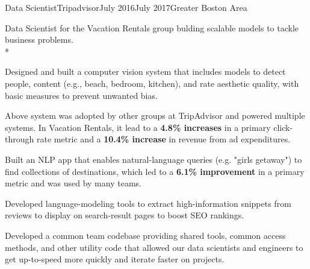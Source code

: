 \documentclass[print]{friggeri-cv} %
\begin{document}
\begin{job}
  {\tripicon}{Data Scientist}{Tripadvisor}{July 2016}{July 2017}{Greater Boston Area}{
    Data Scientist for the Vacation Rentals group bulding scalable models to tackle business problems.\\*
    \begin{myitemize}
      \item Designed and built a computer vision system that includes models to
      detect people, content (e.g., beach, bedroom, kitchen), and rate aesthetic
      quality, with basic measures to prevent unwanted bias.

      \item Above system was adopted by other groups at TripAdvisor and powered multiple
      systems. In Vacation Rentals, it lead to a \textbf{4.8\% increases} in a primary
      click-through rate metric and a \textbf{10.4\% increase} in revenue from ad expenditures.

      \item Built an NLP app that enables natural-language queries (e.g. "girls getaway")
      to find collections of destinations, which led to a \textbf{6.1\% improvement} in a
      primary metric and was used by many teams. 

      \item Developed language-modeling tools to extract high-information snippets from reviews
      to display on search-result pages to boost SEO rankings.

      \item Developed a common team codebase providing shared tools, common
      access methods, and other utility code that allowed our data scientists
      and engineers to get up-to-speed more quickly and iterate faster on
      projects.
    \end{myitemize}
  }
  \end{job}
\end{document}
